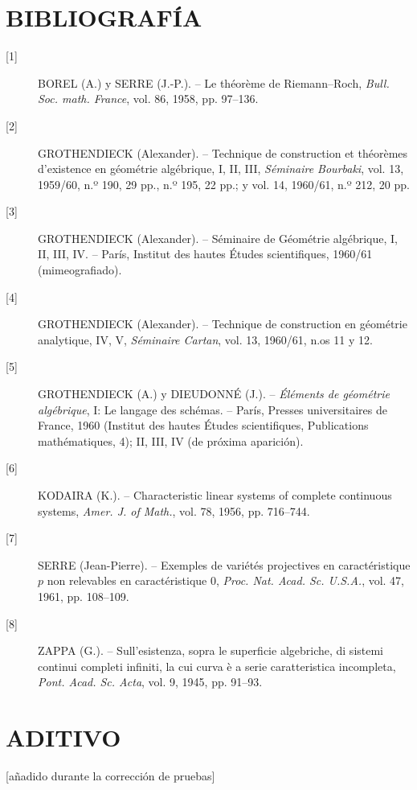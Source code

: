 \documentclass[11pt,twoside,openany]{book}
\numberwithin{equation}{section}
\theoremstyle{plain}
\theoremstyle{definition}
\theoremstyle{remark}
\theoremstyle{plain}
\theoremstyle{definition}
\theoremstyle{remark}
\begin{document}
\section*{BIBLIOGRAFÍA}

\begin{description}
\item[{[1]}] BOREL (A.) y SERRE (J.-P.). -- Le théorème de Riemann--Roch,
\emph{Bull. Soc. math. France}, vol. 86, 1958, pp. 97--136.

\item[{[2]}] GROTHENDIECK (Alexander). -- Technique de construction et
théorèmes d'existence en géométrie algébrique, I, II, III, \emph{Séminaire
Bourbaki}, vol. 13, 1959/60, n.º 190, 29 pp., n.º 195, 22 pp.; y vol. 14,
1960/61, n.º 212, 20 pp.

\item[{[3]}] GROTHENDIECK (Alexander). -- Séminaire de Géométrie algébrique,
I, II, III, IV. -- París, Institut des hautes Études scientifiques, 1960/61
(mimeografiado).

\item[{[4]}] GROTHENDIECK (Alexander). -- Technique de construction en
géométrie analytique, IV, V, \emph{Séminaire Cartan}, vol. 13, 1960/61, n.os 11
y 12.

\item[{[5]}] GROTHENDIECK (A.) y DIEUDONNÉ (J.). -- \emph{Éléments de
géométrie algébrique}, I: Le langage des schémas. -- París, Presses
universitaires de France, 1960 (Institut des hautes Études scientifiques,
Publications mathématiques, 4); II, III, IV (de próxima aparición).

\item[{[6]}] KODAIRA (K.). -- Characteristic linear systems of complete
continuous systems, \emph{Amer. J. of Math.}, vol. 78, 1956, pp. 716--744.

\item[{[7]}] SERRE (Jean-Pierre). -- Exemples de variétés projectives en
caractéristique $p$ non relevables en caractéristique 0, \emph{Proc. Nat. Acad.
Sc. U.S.A.}, vol. 47, 1961, pp. 108--109.

\item[{[8]}] ZAPPA (G.). -- Sull'esistenza, sopra le superficie algebriche, di
sistemi continui completi infiniti, la cui curva è a serie caratteristica
incompleta, \emph{Pont. Acad. Sc. Acta}, vol. 9, 1945, pp. 91--93.
\end{description}

\section*{ADITIVO}
\begin{center}
{\small [añadido durante la corrección de pruebas]}
\end{center}
\end{document}
